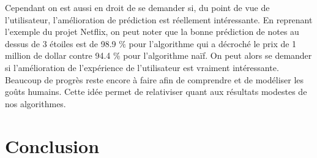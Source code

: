\documentclass[10pt,a4paper]{article}
\begin{document}
Cependant on est aussi en droit de se demander si, du point de vue de l'utilisateur, l'amélioration de prédiction est réellement intéressante. En reprenant l'exemple du projet Netflix, on peut noter que la bonne prédiction de notes au dessus de 3 étoiles est de 98.9 $\%$ pour l'algorithme qui a décroché le prix de 1 million de dollar contre 94.4 $\%$ pour l'algorithme naïf. On peut alors se demander si l'amélioration de l'expérience de l'utilisateur est vraiment intéressante. Beaucoup de progrès reste encore à faire afin de comprendre et de modéliser les goûts humains. Cette idée permet de relativiser quant aux résultats modestes de nos algorithmes.

\section*{Conclusion}

\newpage



\end{document}
